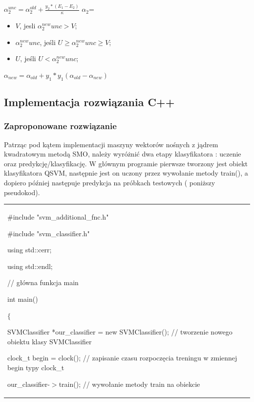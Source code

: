 \documentclass[[10pt,a4paper]{article}
\begin{document}
\begin{enumerate}
\begin{itemize}
$\alpha_{2}^{unc} = \alpha_{2}^{old} + \frac{y_2*(E_1-E_2)}{\kappa}$
\newline
$\alpha_{2}$= 
\begin{itemize}
\item $V$, jesli $\alpha_{2}^{new}{unc}>V$;
\item $\alpha_{2}^{new}{unc}$, jeśli $U\ge\alpha_{2}^{new}{unc}\ge V$;
\item $U$, jeśli $U<\alpha_{2}^{new}{unc}$;
\newline
\end{itemize}
$\alpha_{new} = \alpha_{old} + y_{1}*y_{1}(\alpha_{old}-\alpha_{new})$
\newpage
\subsection{Implementacja rozwiązania C++}
\subsubsection{Zaproponowane rozwiązanie}
Patrząc pod kątem implementacji maszyny wektorów nośnych z jądrem kwadratowym metodą SMO, należy wyróżnić dwa etapy klasyfikatora : uczenie oraz predykcję/klasyfikację. W głównym programie pierwsze tworzony jest obiekt klasyfikatora QSVM, następnie jest on uczony przez wywołanie metody train(), a dopiero później następuje predykcja na próbkach testowych ( poniższy pseudokod).\\ 

\begin{tabular}{|p{11.5cm}|} \hline\noindent \#include "svm\_additional\_fnc.h"

\noindent \#include "svm\_classifier.h"

\noindent 

\noindent using std::cerr;

\noindent using std::endl;

\noindent // g{\l}\'{o}wna funkcja main

\noindent int main()

\noindent $\{$

 SVMClassifier *our\_classifier = new SVMClassifier();  // tworzenie nowego obiektu klasy SVMClassifier 

\noindent 

 clock\_t begin = clock();  // zapisanie czasu rozpocz\k{e}cia treningu w zmiennej begin typy clock\_t

 our\_classifier-$>$train(); // wywo{\l}anie metody train na obiekcie


\end{tabular}
\end{itemize}
\end{enumerate}
\end{document}
